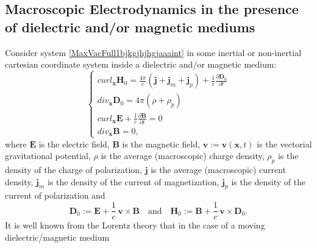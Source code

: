 \documentclass{article}
\theoremstyle{definition}
\theoremstyle{remark}
\renewcommand{\vec}[1]{\mathbf{#1}}
\newcommand{\R}{\mathbb{R}}
\newcommand{\er}{\eqref}
\newcommand{\R}{{\mathbb{R}}}
\newcommand{\er}{\eqref}
\begin{document}
\subsection{Macroscopic Electrodynamics in the presence of dielectric and/or magnetic
mediums} Consider system  \er{MaxVacFull1bjkgjhjhgjaaaint}
in some inertial or non-inertial cartesian coordinate system inside
a dielectric and/or magnetic medium:
\begin{equation}\label{MaxVacFullnnnnGGint}
\begin{cases}
curl_{\vec x} \vec H_0= \frac{4\pi}{c}\left(\vec j+\vec j_m+\vec
j_p\right)+ \frac{1}{c}\frac{\partial \vec D_0}{\partial t}
\\
div_{\vec x} \vec D_0= 4\pi\left(\rho+\rho_p\right)
\\
curl_{\vec x} \vec E+\frac{1}{c}\frac{\partial \vec B}{\partial t}=0
\\
div_{\vec x} \vec B= 0,
\end{cases}
\end{equation}
where $\vec E$ is the electric field, $\vec B$ is the magnetic
field, $\vec v:=\vec v(\vec x,t)$ is the vectorial gravitational
potential, $\rho$ is the average (macroscopic) charge density,
$\rho_p$ is the density of the charge of polarization, $\vec j$ is
the average (macroscopic) current density, $\vec j_m$ is the density
of the current of magnetization, $\vec j_p$ is the density of the
current of polarization and
\begin{equation}\label{MaxVacFullnnnngkggjkklhGGint}
\vec D_0:=\vec E+\frac{1}{c}\,\vec v\times \vec
B\quad\text{and}\quad
\vec H_0:=\vec B+\frac{1}{c}\,\vec v\times \vec D_0.
\end{equation}
It is well known from the Lorentz theory that in the case of a
moving dielectric/magnetic medium
\end{document}
